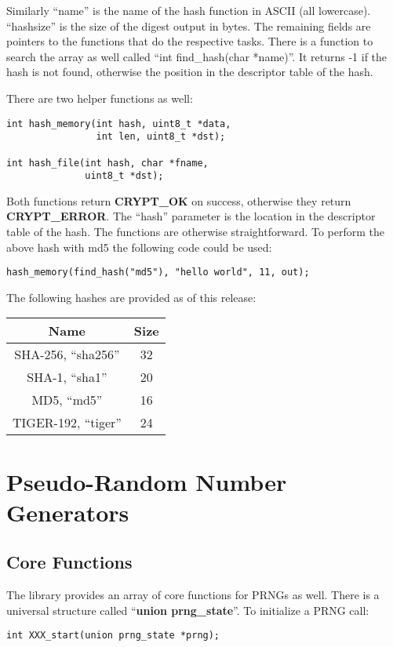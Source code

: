\documentclass{book}
\begin{document}
Similarly ``name'' is the name of the hash function in ASCII (all lowercase).  ``hashsize'' is the size of the digest output
in bytes.  The remaining fields are pointers to the functions that do the respective tasks.  There is a function to
search the array as well called ``int find\_hash(char *name)''.  It returns -1 if the hash is not found, otherwise the
position in the descriptor table of the hash.

There are two helper functions as well:
\begin{verbatim}
int hash_memory(int hash, uint8_t *data, 
                int len, uint8_t *dst);

int hash_file(int hash, char *fname, 
              uint8_t *dst);
\end{verbatim}

Both functions return {\bf CRYPT\_OK} on success, otherwise they return {\bf CRYPT\_ERROR}.  The ``hash'' parameter is
the location in the descriptor table of the hash.  The functions are otherwise straightforward.  To perform the above 
hash with md5 the following code could be used:
\begin{verbatim}
hash_memory(find_hash("md5"), "hello world", 11, out);
\end{verbatim}

The following hashes are provided as of this release:
\begin{center}
\begin{tabular}{|c|c|}
      \hline Name & Size \\
      \hline SHA-256, ``sha256'' & 32 \\
      \hline SHA-1, ``sha1'' & 20 \\
      \hline MD5, ``md5'' & 16 \\
      \hline TIGER-192, ``tiger'' & 24 \\
      \hline
\end{tabular}
\end{center}

\chapter{Pseudo-Random Number Generators}
\section{Core Functions}

The library provides an array of core functions for PRNGs as well.  There is a universal structure called 
``{\bf union prng\_state}''.  To initialize a PRNG call:
\begin{verbatim}
int XXX_start(union prng_state *prng);
\end{verbatim}
\end{document}
